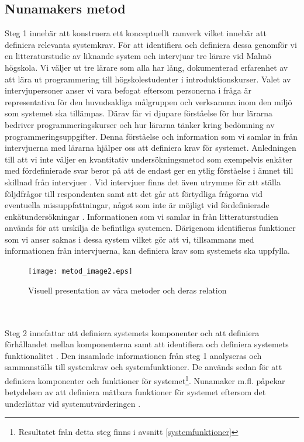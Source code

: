 \documentclass[a4paper,11pt]{article}
\begin{document}
{%

\subsection{Nunamakers metod}\label{Nunamakers metod}

Steg 1 innebär att konstruera ett konceptuellt ramverk vilket innebär att definiera relevanta systemkrav. För att identifiera och definiera dessa genomför vi en litteraturstudie av liknande system och intervjuar tre lärare vid Malmö högskola. Vi väljer ut tre lärare som alla har lång, dokumenterad erfarenhet av att lära ut programmering till högskolestudenter i introduktionskurser. Valet av intervjupersoner anser vi vara befogat eftersom personerna i fråga är representativa för den huvudsakliga målgruppen och verksamma inom den miljö som systemet ska tillämpas. Därav får vi djupare förståelse för hur lärarna bedriver programmeringskurser och hur lärarna tänker kring bedömning av programmeringsuppgifter. Denna förståelse och information som vi samlar in från intervjuerna med lärarna hjälper oss att definiera krav för systemet.
Anledningen till att vi inte väljer en kvantitativ undersökningsmetod som exempelvis enkäter med fördefinierade svar beror på att de endast ger en ytlig förståelse i ämnet till skillnad från intervjuer \cite{seminarieboken}. Vid intervjuer finns det även utrymme för att ställa följdfrågor till respondenten samt att det går att förtydliga frågorna vid eventuella missuppfattningar, något som inte är möjligt vid fördefinierade enkätundersökningar \cite{seminarieboken}. Informationen som vi samlar in från litteraturstudien används för att urskilja de befintliga systemen. Därigenom identifieras funktioner som vi anser saknas i dessa system vilket gör att vi, tillsammans med informationen från intervjuerna, kan definiera krav som systemets ska uppfylla.
\begin{figure}[ht!]
\centering
\texttt{[image: metod\_image2.eps]}
\caption{Visuell presentation av våra metoder och deras relation}
\label{fig:metod_visual}
\end{figure}
\\
\\
Steg 2 innefattar att definiera systemets komponenter och att definiera förhållandet mellan komponenterna samt att identifiera och definiera systemets funktionalitet \cite{nunamaker}. Den insamlade informationen från steg 1 analyseras och sammanställs till systemkrav och systemfunktioner. De används sedan för att definiera komponenter och funktioner för systemet\footnote{Resultatet från detta steg finns i avsnitt \ref{systemfunktioner}}. Nunamaker m.fl. påpekar betydelsen av att definiera mätbara funktioner för systemet eftersom det underlättar vid systemutvärderingen \cite{nunamaker}.
}
\end{document}
